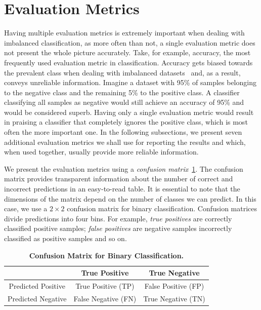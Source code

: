 \section{Evaluation Metrics}
\label{section:metrics}

Having multiple evaluation metrics is extremely important when dealing with imbalanced
classification, as more often than not, a single evaluation metric does not present the whole
picture accurately. Take, for example, accuracy, the most frequently used evaluation metric in
classification. Accuracy gets biased towards the prevalent class when dealing with imbalanced
datasets~\cite{learning-from-imb-data, gosain2017, baccuracy} and, as a result, conveys unreliable
information. Imagine a dataset with 95\% of samples belonging to the negative class and the
remaining 5\% to the positive class. A classifier classifying all samples as negative would still
achieve an accuracy of 95\% and would be considered superb. Having only a single evaluation metric
would result in praising a classifier that completely ignores the positive class, which is most
often the more important one. In the following subsections, we present seven additional evaluation
metrics we shall use for reporting the results and which, when used together, usually provide more
reliable information.

We present the evaluation metrics using a \emph{confusion matrix}~\ref{table:confusion-matrix}.
The confusion matrix provides transparent information about the number of correct and incorrect
predictions in an easy-to-read table. It is essential to note that the dimensions of the matrix
depend on the number of classes we can predict. In this case, we use a $2\times2$ confusion matrix
for binary classification.  Confusion matrices divide predictions into four bins. For example,
\emph{true positives} are correctly classified positive samples; \emph{false positives} are
negative samples incorrectly classified as positive samples and so on.

\begin{table}
    \centering

    \begin{tabular}{c|cc}
        {}                 & True Positive       & True Negative       \\
        \midrule
        Predicted Positive & True Positive (TP)  & False Positive (FP) \\
        Predicted Negative & False Negative (FN) & True Negative (TN)  \\
    \end{tabular}

    \caption{\textbf{Confusion Matrix for Binary Classification.}}
    \label{table:confusion-matrix}
\end{table}

